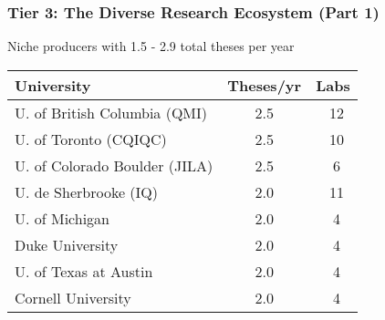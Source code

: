 \documentclass[aspectratio=169]{beamer}
\newcommand{\tabletext}{\small}
\begin{document}
\begin{frame}
    \frametitle{Tier 3: The Diverse Research Ecosystem (Part 1)}
    Niche producers with 1.5 - 2.9 total theses per year
    
    \begin{table}
        \centering
        \tabletext
        \begin{tabularx}{\textwidth}{
            l
            S[table-format=1.1]
            S[table-format=2.0, table-space-text-pre=~]
        }
            \toprule
            \textbf{University} & {\textbf{Theses/yr}} & {\textbf{Labs}} \\
            \midrule
            U. of British Columbia (QMI) & 2.5 & ~12 \\
            U. of Toronto (CQIQC) & 2.5 & ~10 \\
            U. of Colorado Boulder (JILA) & 2.5 & ~6 \\
            U. de Sherbrooke (IQ) & 2.0 & ~11 \\
            U. of Michigan & 2.0 & ~4 \\
            Duke University & 2.0 & ~4 \\
            U. of Texas at Austin & 2.0 & ~4 \\
            Cornell University & 2.0 & ~4 \\
            \bottomrule
        \end{tabularx}
    \end{table}
\end{frame}
\end{document}
